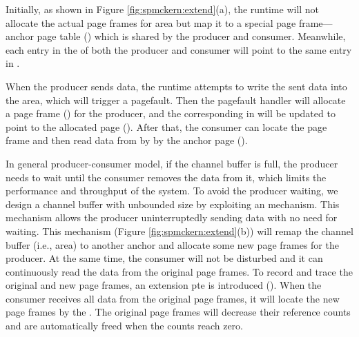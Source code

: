 Initially, as shown in Figure \ref{fig:spmckern:extend}(a), the runtime will not allocate the actual page frames for  area but map it to a special page frame--- anchor page table () which is shared by the producer and consumer.
Meanwhile, each entry in the  of both the producer and consumer will point to the same entry in . 

When the producer sends data, the runtime attempts to write the sent data into the  area, which will trigger a pagefault. 
Then the pagefault handler will allocate a page frame () for the producer, and the corresponding  in  will be updated to point to the allocated page (). 
After that, the consumer can locate the page frame   and then read data from  by by the anchor page ().


In general producer-consumer model, if the channel buffer is full, the producer needs to wait until the consumer removes the data from it, which limits the performance and throughput of the system.
To avoid the producer waiting, we design a channel buffer with unbounded size  by exploiting an  mechanism\cite{zhang13lazy}.
This mechanism allows the producer uninterruptedly sending data with no need for waiting.
This  mechanism (Figure  \ref{fig:spmckern:extend}(b)) will remap the channel buffer (i.e.,  area) to another anchor and allocate some new page frames for the producer. 
At the same time, the consumer will not be disturbed and it can continuously read the data from the original page frames.
To record and trace the original  and  new page frames, an extension pte is introduced ().
When the consumer receives all data from the original page frames, it will locate the new page frames by the .
The original page frames will decrease their reference counts and are automatically freed  when the counts reach zero.


